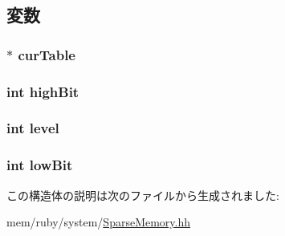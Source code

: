 \subsection{変数}
\hypertarget{structCurNextInfo_ac7a02081ea67fec9f28f80ab2f32076f}{
\subsubsection[{curTable}]{$\ast$ {\bf curTable}}}
\label{structCurNextInfo_ac7a02081ea67fec9f28f80ab2f32076f}
\hypertarget{structCurNextInfo_a37935763846e4f7567926b7718471bd2}{
\subsubsection[{highBit}]{\setlength{\rightskip}{0pt plus 5cm}int {\bf highBit}}}
\label{structCurNextInfo_a37935763846e4f7567926b7718471bd2}
\hypertarget{structCurNextInfo_acf4d33ee4cff36f69b924471174dcb11}{
\subsubsection[{level}]{\setlength{\rightskip}{0pt plus 5cm}int {\bf level}}}
\label{structCurNextInfo_acf4d33ee4cff36f69b924471174dcb11}
\hypertarget{structCurNextInfo_a34ee3b3cc8c62038210ed3976c74d9b9}{
\subsubsection[{lowBit}]{\setlength{\rightskip}{0pt plus 5cm}int {\bf lowBit}}}
\label{structCurNextInfo_a34ee3b3cc8c62038210ed3976c74d9b9}


この構造体の説明は次のファイルから生成されました:\begin{DoxyCompactItemize}
\item 
mem/ruby/system/\hyperlink{SparseMemory_8hh}{SparseMemory.hh}\end{DoxyCompactItemize}
